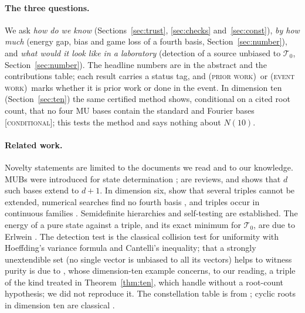 \documentclass[11pt]{article}
\newcommand{\Tz}{\mathcal{T}_0}          %
\newcommand{\st}[1]{\textsc{[#1]}}
\newcommand{\stcond}{\st{conditional}}
\newcommand{\event}{\textsc{(event work)}}
\newcommand{\prior}{\textsc{(prior work)}}
\theoremstyle{definition}
\theoremstyle{remark}
\begin{document}
\paragraph{The three questions.} We ask \emph{how do we know} (Sections~\ref{sec:trust}, \ref{sec:checks}
and~\ref{sec:const}), \emph{by how much} (energy gap, bias and game loss of a fourth basis, Section~\ref{sec:number}), and
\emph{what would it look like in a laboratory} (detection of a source unbiased to $\Tz$, Section~\ref{sec:number}). The
headline numbers are in the abstract and the contributions table; each result carries a status tag, and \prior\ or
\event\ marks whether it is prior work or done in the event. In dimension ten (Section~\ref{sec:ten}) the same certified
method shows, conditional on a cited root count, that no four MU bases contain the standard and Fourier bases \stcond;
this tests the method and says nothing about $N(10)$.

\paragraph{Related work.} Novelty statements are limited to the documents we read and to our knowledge.
MUBs were introduced for state determination \cite{Ivanovic81,WF}; \cite{DEBZ,MWreview} are reviews, and \cite{Weiner13} shows that $d$ such bases extend to $d+1$. In dimension six,
\cite{Grassl,MW12} show that several triples cannot be extended, numerical searches find no fourth basis
\cite{BH07,BBELTZ07,BW08,BW09,RLE,CMFFA22}, and triples occur in continuous families
\cite{JMMSW,Karlsson11a,Karlsson11b,Szollosi12}. Semidefinite hierarchies \cite{BW10,GP24,Mortimer23,Sarkar26} and self-testing \cite{FK19,TFRBK21} are established. The energy of a pure state against a triple, and its exact minimum
for $\Tz$, are due to Erlwein \cite{Erlwein}. The detection test is the classical collision test for uniformity
\cite{GR00,Paninski08} with Hoeffding's variance formula \cite{Hoeffding48} and Cantelli's inequality; that a strongly
unextendible set (no single vector is unbiased to all its vectors) helps to witness purity is due to \cite{GMMP17}, whose
dimension-ten example concerns, to our reading, a triple of the kind treated in Theorem~\ref{thm:ten}, which \cite{GMMP17} handle without a root-count hypothesis; we did not reproduce it. The constellation table is from \cite{BW08}; cyclic roots in dimension ten are classical \cite{Bjorck90,BS95,Haagerup96,Haagerup08}.
\end{document}
